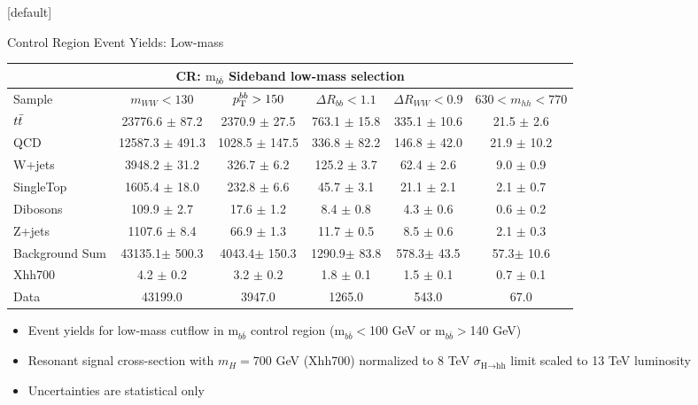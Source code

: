 \documentclass{beamer}
\newcommand*{\ttbar}{\ensuremath{\lowercase{t\bar{t}}}\xspace}
\newcommand*{\mbb}{\ensuremath{\text{m}_{b\bar{b}}}\xspace}
\begin{document}
{  \makeatletter %
  [default]
  \def\beamer@entrycode{\vspace*{-1.075\headheight}}
  \begin{frame}{Control Region Event Yields: Low-mass}
    \begin{table}
      \begin{adjustbox}{width=1\textwidth}
        \begin{tabular}{l|c|c|c|c|c}
          \hline\hline
          \multicolumn{6}{c}{\textbf{CR}: \mbb Sideband low-mass selection}\\\hline\hline
          Sample  	& $m_{WW}<130$ 	& $p_{\rm T}^{bb}>150$ 	& $\Delta R_{bb}<1.1$  	& $\Delta R_{WW} <0.9$   & $630 < m_{hh} < 770$\\\hline
          \ttbar 	& 23776.6 $\pm$ 87.2 	& 2370.9 $\pm$ 27.5 	& 763.1 $\pm$ 15.8 	& 335.1 $\pm$ 10.6 	& 21.5 $\pm$ 2.6 		\\\hline 
          QCD 	& 12587.3 $\pm$ 491.3 	& 1028.5 $\pm$ 147.5 	& 336.8 $\pm$ 82.2 	& 146.8 $\pm$ 42.0 	& 21.9 $\pm$ 10.2 		\\\hline 
          W+jets 	& 3948.2 $\pm$ 31.2 	& 326.7 $\pm$ 6.2 	& 125.2 $\pm$ 3.7 	& 62.4 $\pm$ 2.6 	& 9.0 $\pm$ 0.9 		\\\hline 
          SingleTop 	& 1605.4 $\pm$ 18.0 	& 232.8 $\pm$ 6.6 	& 45.7 $\pm$ 3.1 	& 21.1 $\pm$ 2.1 	& 2.1 $\pm$ 0.7 		\\\hline 
          Dibosons 	& 109.9 $\pm$ 2.7 	& 17.6 $\pm$ 1.2 	& 8.4 $\pm$ 0.8 	& 4.3 $\pm$ 0.6 	& 0.6 $\pm$ 0.2 	\\\hline 
          Z+jets 	& 1107.6 $\pm$ 8.4 	& 66.9 $\pm$ 1.3 	& 11.7 $\pm$ 0.5 	& 8.5 $\pm$ 0.6 	& 2.1 $\pm$ 0.3 	\\\hline 
          \hline
          Background Sum 	& 43135.1$\pm$ 500.3 	& 4043.4$\pm$ 150.3 	& 1290.9$\pm$ 83.8 	& 578.3$\pm$ 43.5 	& 57.3$\pm$ 10.6 	\\\hline 
          \hline
          Xhh700 	& 4.2 $\pm$ 0.2 	& 3.2 $\pm$ 0.2 	& 1.8 $\pm$ 0.1 	& 1.5 $\pm$ 0.1 	& 0.7 $\pm$ 0.1 	\\\hline 
          Data 	& 43199.0 	& 3947.0 	& 1265.0 	& 543.0 	& 67.0	\\\hline 
          \hline
        \end{tabular}
        \label{tab:CR2}
      \end{adjustbox}
    \end{table}
    \begin{itemize}
    \item Event yields for low-mass cutflow in \mbb control region (\mbb$<$100 GeV or \mbb$>$140 GeV)
    \item Resonant signal cross-section with $m_H=700$ GeV (Xhh700) normalized to 8 TeV $\sigma_{\text{H}\to \text{hh}}$ limit scaled to 13 TeV luminosity
    \item Uncertainties are statistical only
    \end{itemize}
  \end{frame}
  
}
\end{document}
